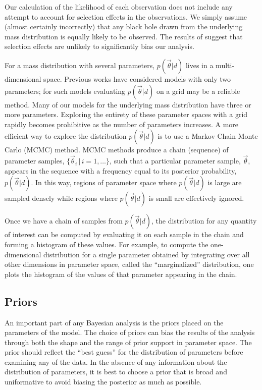 \documentclass[preprint]{aastex}
\newcommand{\vtheta}{\vec{\theta}}
\begin{document}
Our calculation of the likelihood of each observation does not include
any attempt to account for selection effects in the observations.  We
simply assume (almost certainly incorrectly) that any black hole drawn
from the underlying mass distribution is equally likely to be
observed.  The results of \citet{Ozel2010} suggest that selection
effects are unlikely to significantly bias our analysis.

For a mass distribution with several parameters, $p(\vtheta | d)$
lives in a multi-dimensional space.  Previous works
\citep{Ozel2010,Bailyn1998} have considered models with only two
parameters; for such models evaluating $p(\vtheta|d)$ on a grid may be
a reliable method.  Many of our models for the underlying mass
distribution have three or more parameters.  Exploring the entirety of
these parameter spaces with a grid rapidly becomes prohibitive as the
number of parameters increases.  A more efficient way to explore the
distribution $p(\vtheta | d)$ is to use a Markov Chain Monte Carlo
(MCMC) method.  MCMC methods produce a chain (sequence) of parameter
samples, $\{ \vtheta_i \, | \, i = 1, \ldots \}$, such that a
particular parameter sample, $\vtheta$, appears in the sequence with a
frequency equal to its posterior probability, $p(\vtheta|d)$.  In this
way, regions of parameter space where $p(\vtheta|d)$ is large are
sampled densely while regions where $p(\vtheta|d)$ is small are
effectively ignored.

Once we have a chain of samples from $p(\vtheta|d)$, the distribution
for any quantity of interest can be computed by evaluating it on each
sample in the chain and forming a histogram of these values.  For
example, to compute the one-dimensional distribution for a single
parameter obtained by integrating over all other dimensions in
parameter space, called the ``marginalized'' distribution, one plots
the histogram of the values of that parameter appearing in the chain.

\subsection{Priors}
\label{sec:priors}

An important part of any Bayesian analysis is the priors placed on the
parameters of the model.  The choice of priors can bias the results of
the analysis through both the shape and the range of prior support in
parameter space.  The prior should reflect the ``best guess'' for the
distribution of parameters before examining any of the data.  In the
absence of any information about the distribution of parameters, it is
best to choose a prior that is broad and uniformative to avoid biasing
the posterior as much as possible.
\end{document}
